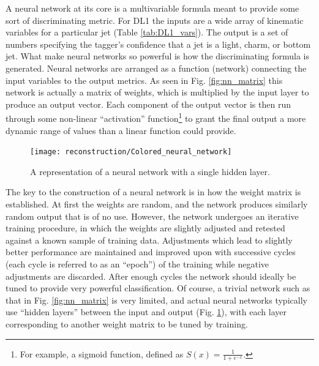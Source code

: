             A neural network at its core is a multivariable formula meant to provide some sort of discriminating metric\cite{MLatLHC}.
            For DL1 the inputs are a wide array of kinematic variables for a particular jet (Table \ref{tab:DL1_vars}).
            The output is a set of numbers specifying the tagger's confidence that a jet is
                a light, charm, or bottom jet.
            What make neural networks so powerful is how the discriminating formula is generated.
            Neural networks are arranged as a function (network) connecting the input variables to the output metrics. 
            As seen in Fig. \ref{fig:nn_matrix} this network is actually a matrix of weights,
                which is multiplied by the input layer to produce an output vector.
            Each component of the output vector is then run through some non-linear ``activation'' function\footnote{
                    For example, a sigmoid function, defined as $S(x) = \frac{1}{1+e^{-x}}$.
                } to grant the final output a more dynamic range of values than a linear function could provide.

            \begin{figure}[tbh] \center
                \texttt{[image: reconstruction/Colored\_neural\_network]}
                \caption{
                    A representation of a neural network with a single hidden layer\cite{colored_neural_network}.
                }
                \label{fig:colored_neural_network}
            \end{figure}

            The key to the construction of a neural network is in how the weight matrix is established.
            At first the weights are random, and the network produces similarly random output that is of no use.
            However, the network undergoes an iterative training procedure, in which the weights are slightly adjusted
                and retested against a known sample of training data.
            Adjustments which lead to slightly better performance are maintained and improved upon
                with successive cycles (each cycle is referred to as an ``epoch'')
                of the training while negative adjustments are discarded.
            After enough cycles the network should ideally be tuned to provide very powerful classification.
            Of course, a trivial network such as that in Fig. \ref{fig:nn_matrix} is very limited,
                and actual neural networks typically use ``hidden layers'' between the input and output (Fig. \ref{fig:colored_neural_network}),
                with each layer corresponding to another weight matrix to be tuned by training.

